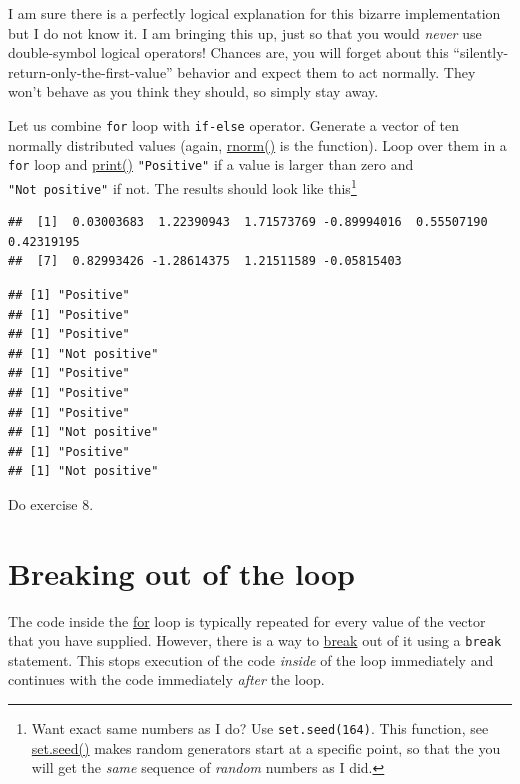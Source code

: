 \documentclass[
]{book}
\begin{document}
I am sure there is a perfectly logical explanation for this bizarre implementation but I do not know it. I am bringing this up, just so that you would \emph{never} use double-symbol logical operators! Chances are, you will forget about this ``silently-return-only-the-first-value'' behavior and expect them to act normally. They won't behave as you think they should, so simply stay away.

Let us combine \texttt{for} loop with \texttt{if-else} operator. Generate a vector of ten normally distributed values (again, \href{https://stat.ethz.ch/R-manual/R-devel/library/stats/html/Normal.html}{rnorm()} is the function). Loop over them in a \texttt{for} loop and \href{https://stat.ethz.ch/R-manual/R-devel/library/base/html/print.html}{print()} \texttt{"Positive"} if a value is larger than zero and \texttt{"Not\ positive"} if not. The results should look like this\footnote{Want exact same numbers as I do? Use \texttt{set.seed(164)}. This function, see \href{https://stat.ethz.ch/R-manual/R-devel/library/base/html/Random.html}{set.seed()} makes random generators start at a specific point, so that the you will get the \emph{same} sequence of \emph{random} numbers as I did.}

\begin{verbatim}
##  [1]  0.03003683  1.22390943  1.71573769 -0.89994016  0.55507190  0.42319195
##  [7]  0.82993426 -1.28614375  1.21511589 -0.05815403
\end{verbatim}

\begin{verbatim}
## [1] "Positive"
## [1] "Positive"
## [1] "Positive"
## [1] "Not positive"
## [1] "Positive"
## [1] "Positive"
## [1] "Positive"
## [1] "Not positive"
## [1] "Positive"
## [1] "Not positive"
\end{verbatim}

Do exercise 8.

\hypertarget{breaking-out-of-the-loop}{%
\section{Breaking out of the loop}\label{breaking-out-of-the-loop}}

The code inside the \href{https://stat.ethz.ch/R-manual/R-devel/library/base/html/Control.html}{for} loop is typically repeated for every value of the vector that you have supplied. However, there is a way to \href{https://stat.ethz.ch/R-manual/R-devel/library/base/html/Control.html}{break} out of it using a \texttt{break} statement. This stops execution of the code \emph{inside} of the loop immediately and continues with the code immediately \emph{after} the loop.
\end{document}
